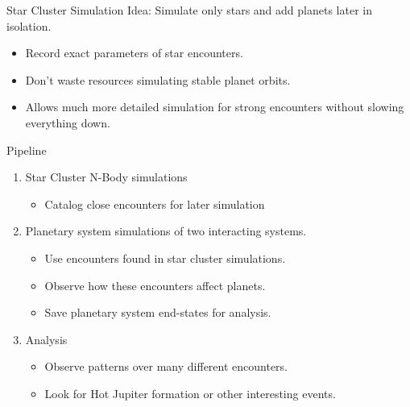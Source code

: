 \documentclass{beamer}
\begin{document}
\begin{frame}{Star Cluster Simulation}
    Idea: Simulate only stars and add planets later in isolation.
    \begin{itemize}
        \item Record exact parameters of star encounters.
        \item Don't waste resources simulating stable planet orbits.
        \item Allows much more detailed simulation for strong encounters
            without slowing everything down.
    \end{itemize}
\end{frame}

\begin{frame}{Pipeline}
    \begin{enumerate}
        \item Star Cluster N-Body simulations
            \begin{itemize}
                \item Catalog close encounters for later simulation
            \end{itemize}
        \item Planetary system simulations of two interacting systems.
            \begin{itemize}
                \item Use encounters found in star cluster simulations.
                \item Observe how these encounters affect planets.
                \item Save planetary system end-states for analysis.
            \end{itemize}
        \item Analysis 
            \begin{itemize}
                \item Observe patterns over many different encounters.
                \item Look for Hot Jupiter formation or other interesting events.
            \end{itemize}
    \end{enumerate}
\end{frame}
\end{document}
